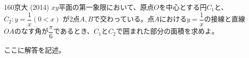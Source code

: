 \begin{prob}{160}{}{京大 (2014)}
 $xy$平面の第一象限において、原点$O$を中心とする円$C_1$と、$C_2: y=\dfrac{1}{x} (0<x)$ が2点$A, B$で交わっている。点$A$における$y=\dfrac{1}{x}$の接線と直線$OA$のなす角が$\dfrac{\pi}{6}$であるとき、$C_1$と$C_2$で囲まれた部分の面積を求めよ。
\end{prob}
ここに解答を記述。